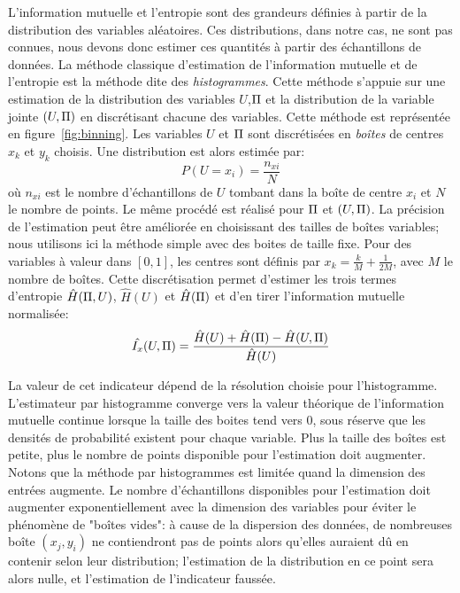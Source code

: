\documentclass[../main]{subfiles}
\begin{document}
L'information mutuelle et l'entropie sont des grandeurs définies à partir de la distribution des variables aléatoires. Ces distributions, dans notre cas, ne sont pas connues, nous devons donc estimer ces quantités à partir des échantillons de données.
La méthode classique d'estimation de l'information mutuelle et de l'entropie est la méthode dite des \emph{histogrammes}.
Cette méthode s'appuie sur une estimation de la distribution des variables $U$,$\Pi$ et la distribution de la variable jointe $(U,\Pi)$ en discrétisant chacune des variables.
Cette méthode est représentée en figure~\ref{fig:binning}. Les variables $U$ et $\Pi$ sont discrétisées en \emph{boîtes} de centres $x_k$ et $y_k$ choisis.
Une distribution est alors estimée par: 
$$P(U = x_i) = \frac{n_{xi}}{N} $$ où $n_{xi}$ est le nombre d'échantillons de $U$ tombant dans la boîte de centre $x_i$ et $N$ le nombre de points. Le même procédé est réalisé pour $\Pi$ et $(U,\Pi)$. La précision de l'estimation peut être améliorée en choisissant des tailles de boîtes variables; nous utilisons ici la méthode simple avec des boites de taille fixe.
Pour des variables à valeur dans $[0,1]$, les centres sont définis par $x_k = \frac{k}{M}+\frac{1}{2M}$, avec $M$ le nombre de boîtes.
Cette discrétisation permet d'estimer les trois termes d'entropie $\hat{H}(\Pi,U)$, $\hat{H}(U)$ et $\hat{H}(\Pi)$ et d'en tirer l'information mutuelle normalisée:
\begin{equation}
    \hat{I_x}(U,\Pi) = \frac{\hat{H}(U) + \hat{H}(\Pi) - \hat{H}(U,\Pi)}{\hat{H}(U)}
   \end{equation}

La valeur de cet indicateur dépend de la résolution choisie pour l'histogramme. L'estimateur  par histogramme converge vers la valeur théorique de l'information mutuelle continue lorsque la taille des boites tend vers 0, sous réserve que les densités de probabilité existent pour chaque variable. Plus la taille des boîtes est petite, plus le nombre de points disponible pour l'estimation doit augmenter.
Notons que la méthode par histogrammes est limitée quand la dimension des entrées augmente.
Le nombre d'échantillons disponibles pour l'estimation doit augmenter exponentiellement avec la dimension des variables pour éviter le phénomène de "boîtes vides": à cause de la dispersion des données, de nombreuses boîte $(x_j,y_i)$ ne contiendront pas de points alors qu'elles auraient dû en contenir selon leur distribution; l'estimation de la distribution en ce point sera alors nulle, et l'estimation de l'indicateur faussée.
\end{document}
